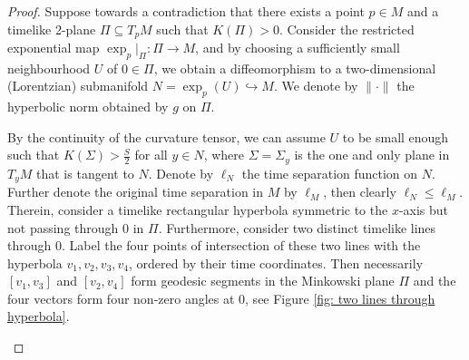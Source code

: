 \documentclass[hidelinks,12pt,a4paper]{article}
\numberwithin{equation}{section}
\theoremstyle{plain}
\theoremstyle{definition}
\begin{document}
\begin{proof}
Suppose towards a contradiction that there exists a point $p \in M$ and a timelike 2-plane $\Pi \subseteq T_pM$ such that $K(\Pi) > 0 $. 
Consider the restricted exponential map $\exp_p|_{\Pi}:\Pi \to M$, and
by choosing a sufficiently small neighbourhood $U$ of $0 \in \Pi$, we obtain a diffeomorphism to a two-dimensional (Lorentzian) submanifold $N=\exp_p(U) \hookrightarrow M$. We denote by $\| \cdot \|$ the hyperbolic norm obtained by $g$ on $\Pi$.

By the continuity of the curvature tensor, we can assume $U$ to be small enough such that $K(\Sigma) > \frac{S}2$ for all $y \in N$, where $\Sigma = \Sigma_y$ is the one and only plane in $T_yM$ that is tangent to $N$. 
Denote by $\ell_N$ the time separation function on $N$. Further denote the original time separation in $M$ by $\ell_M$, then clearly $\ell_N \leq \ell_M$. 
Therein, consider a timelike rectangular hyperbola symmetric to the $x$-axis but not passing through $0$ in $\Pi$.
Furthermore, consider two distinct timelike lines through $0$. 
Label the four points of intersection of these two lines with the hyperbola $v_1, v_2, v_3, v_4$, ordered by their time coordinates. 
Then necessarily $[v_1,v_3]$ and $[v_2,v_4]$ form geodesic segments in the Minkowski plane $\Pi$ and the four vectors form four non-zero angles at 0, see Figure \ref{fig: two lines through hyperbola}. 

\begin{figure}
\begin{center}
\end{center}
\end{figure}
\end{proof}
\end{document}

